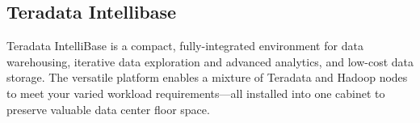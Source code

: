 \subsection{Teradata Intellibase}
Teradata IntelliBase is a compact, fully-integrated environment for data 
warehousing, iterative data exploration and advanced analytics, and low-cost 
data storage. The versatile platform enables a mixture of Teradata and Hadoop 
nodes to meet your varied workload requirements—all installed into one cabinet
to preserve valuable data center floor space.
\cite{Teradata Intellibase}

